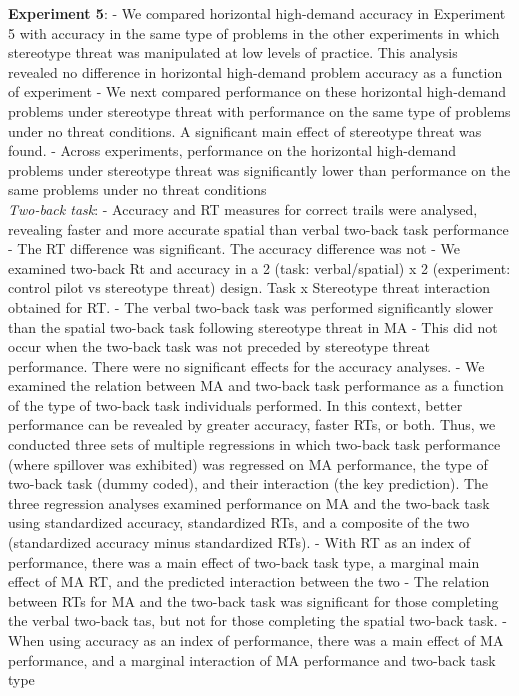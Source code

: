 \documentclass[
  doc, a4paper]{apa7}
\begin{document}
\textbf{Experiment 5}:
- We compared horizontal high-demand accuracy in Experiment 5 with accuracy in the same type of problems in the other experiments in which stereotype threat was manipulated at low levels of practice. This analysis revealed no difference in horizontal high-demand problem accuracy as a function of experiment
- We next compared performance on these horizontal high-demand problems under stereotype threat with performance on the same type of problems under no threat conditions. A significant main effect of stereotype threat was found.
- Across experiments, performance on the horizontal high-demand problems under stereotype threat was significantly lower than performance on the same problems under no threat conditions\\
\emph{Two-back task}:
- Accuracy and RT measures for correct trails were analysed, revealing faster and more accurate spatial than verbal two-back task performance
- The RT difference was significant. The accuracy difference was not
- We examined two-back Rt and accuracy in a 2 (task: verbal/spatial) x 2 (experiment: control pilot vs stereotype threat) design. Task x Stereotype threat interaction obtained for RT.
- The verbal two-back task was performed significantly slower than the spatial two-back task following stereotype threat in MA
- This did not occur when the two-back task was not preceded by stereotype threat performance. There were no significant effects for the accuracy analyses.
- We examined the relation between MA and two-back task performance as a function of the type of two-back task individuals performed. In this context, better performance can be revealed by greater accuracy, faster RTs, or both. Thus, we conducted three sets of multiple regressions in which two-back task performance (where spillover was exhibited) was regressed on MA performance, the type of two-back task (dummy coded), and their interaction (the key prediction). The three regression analyses examined performance on MA and the two-back task using standardized accuracy, standardized RTs, and a composite of the two (standardized accuracy minus standardized RTs).
- With RT as an index of performance, there was a main effect of two-back task type, a marginal main effect of MA RT, and the predicted interaction between the two
- The relation between RTs for MA and the two-back task was significant for those completing the verbal two-back tas, but not for those completing the spatial two-back task.
- When using accuracy as an index of performance, there was a main effect of MA performance, and a marginal interaction of MA performance and two-back task type
\end{document}
